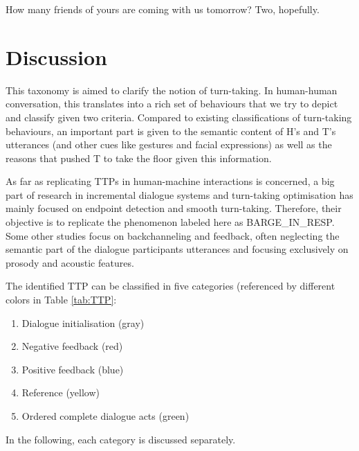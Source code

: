                     	\begin{dialogue}
							 How many friends of yours are coming with us tomorrow?
							 Two, hopefully.
						\end{dialogue}

\section{Discussion}

	This taxonomy is aimed to clarify the notion of turn-taking. In human-human conversation, this translates into a rich set of behaviours that we try to depict and classify given two criteria. Compared to existing classifications of turn-taking behaviours, an important part is given to the semantic content of H's and T's utterances (and other cues like gestures and facial expressions) as well as the reasons that pushed T to take the floor given this information.
    
    As far as replicating TTPs in human-machine interactions is concerned, a big part of research in incremental dialogue systems and turn-taking optimisation has mainly focused on endpoint detection \cite{Raux2008} and smooth turn-taking. Therefore, their objective is to replicate the phenomenon labeled here as BARGE\_IN\_RESP. Some other studies focus on backchanneling and feedback, often neglecting the semantic part of the dialogue participants utterances and focusing exclusively on prosody and acoustic features.
    


    The identified TTP can be classified in five categories (referenced by different colors in Table \ref{tab:TTP}:
    
    \begin{enumerate}
      \item Dialogue initialisation (gray)
      \item Negative feedback (red)
      \item Positive feedback (blue)
      \item Reference (yellow)
      \item Ordered complete dialogue acts (green)
    \end{enumerate}

    In the following, each category is discussed separately.

